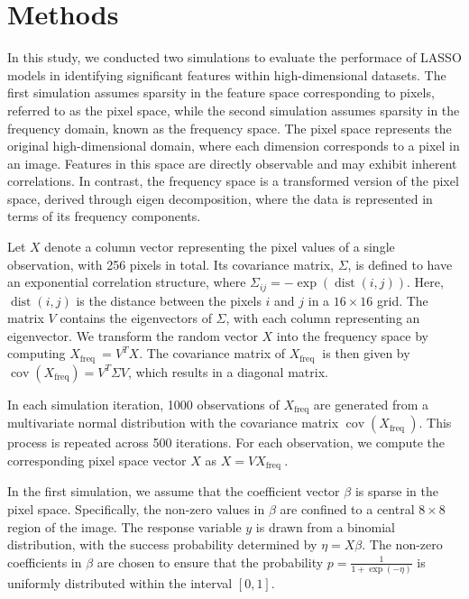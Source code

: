 \documentclass[12pt]{article}
\begin{document}
\section*{Methods}

In this study, we conducted two simulations to evaluate the performace of LASSO models in identifying significant
features within high-dimensional datasets. The first simulation assumes sparsity in the feature space corresponding to
pixels, referred to as the pixel space, while the second simulation assumes sparsity in the frequency domain, known as
the frequency space. The pixel space represents the original high-dimensional domain, where each dimension corresponds
to a pixel in an image. Features in this space are directly observable and may exhibit inherent correlations. In
contrast, the frequency space is a transformed version of the pixel space, derived through eigen decomposition, where
the data is represented in terms of its frequency components.

Let \( X \) denote a column vector representing the pixel values of a single observation, with 256 pixels in total. Its
covariance matrix, \( \Sigma \), is defined to have an exponential correlation structure, where \( \Sigma_{i j}=-\exp
(\operatorname{dist}(i, j)) \). Here, \( \operatorname{dist}(i, j) \) is the distance between the pixels \( i \) and \(
j \) in a \( 16 \times 16 \) grid. The matrix \( V \) contains the eigenvectors of \( \Sigma \), with each column
representing an eigenvector. We transform the random vector \( X \) into the frequency space by computing \( X_{\text
{freq }}=V^T X \). The covariance matrix of \( X_{\text {freq }} \) is then given by \(
\operatorname{cov}(X_{\mathrm{freq}})=V^T \Sigma V \), which results in a diagonal matrix.

In each simulation iteration, 1000 observations of \( X_{\text {freq}} \) are generated from a multivariate normal
distribution with the covariance matrix \(\operatorname{cov}\left(X_{\text {freq }}\right) \). This process is repeated
across 500 iterations.  For each observation, we compute the corresponding pixel space vector \( X \) as \( X=V X_{\text
{freq }} \).

In the first simulation, we assume that the coefficient vector \( \beta \) is sparse in the pixel space. Specifically,
the non-zero values in \( \beta \) are confined to a central \( 8 \times 8 \) region of the image. The response variable
\( y \) is drawn from a binomial distribution, with the success probability determined by \( \eta = X \beta \). The
non-zero coefficients in \( \beta \) are chosen to ensure that the probability \( p = \frac{1}{1 + \exp(-\eta)} \) is
uniformly distributed within the interval \( [0, 1] \).
\end{document}
